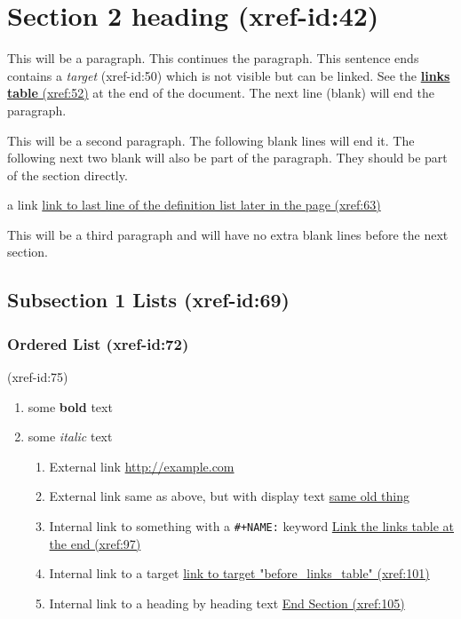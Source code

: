 \documentclass[11pt]{article}
\begin{document}
\section{Section 2 heading   (xref-id:42)  }
 \label{obj-42}
 \label{obj-41}
\begin{quote}
\end{quote}

This will be a paragraph.
This continues the paragraph. This sentence ends contains a
\emph{target}
\label{obj-50} (xref-id:50)
which is not visible but can be linked. See the
\hyperref[obj-385]{\textbf{links table} (xref:52)}
at the end of the document.  The next line (blank) will end the
paragraph.

This will be a second paragraph. 
The following blank lines will end it.
The following next two blank will also be part of the paragraph.
They should be part of the section directly.

a link
\hyperref[obj-161]{link to last line of the definition list later in the page (xref:63)}

\vspace{\baselineskip}
This will be a third paragraph and will have no extra blank lines before the next section.

\subsection{Subsection 1 Lists   (xref-id:69)  }
 \label{obj-69}
 \label{obj-68}
\subsubsection{Ordered List   (xref-id:72)  }
 \label{obj-72}
 \label{obj-71}

 (xref-id:75)
\begin{enumerate} \label{obj-75}
\item
some
\textbf{bold}
text
\item
some
\emph{italic}
text
\begin{enumerate}
\item
External link
\href{http://example.com}{http://example.com}
\item
External link same as above, but with display text
\href{http://example.com}{same old thing}
\item
Internal link to something with a
\texttt{\#+NAME:}
keyword
\hyperref[obj-385]{Link the links table at the end (xref:97)}
\item
Internal link to a target
\hyperref[obj-384]{link to target "before\_links\_table" (xref:101)}
\item
Internal link to a heading by heading text
\hyperref[obj-381]{End Section (xref:105)}
\end{enumerate}
\end{enumerate}
\end{document}
